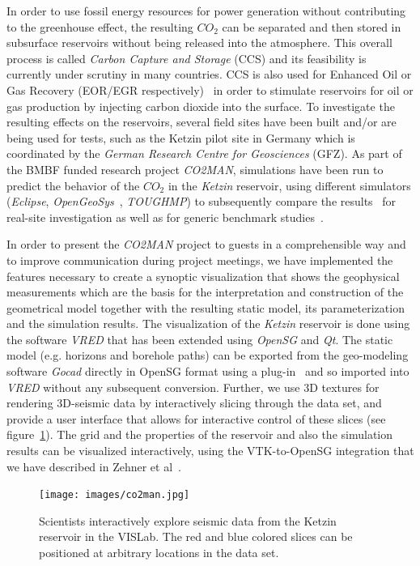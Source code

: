 \documentclass[twocolumn]{svjour3}          %
\begin{document}
In order to use fossil energy resources for power generation without contributing to the greenhouse effect, the resulting $CO_{2}$ can be separated and then stored in subsurface reservoirs without being released into the atmosphere. This overall process is called \emph{Carbon Capture and Storage} (CCS) and its feasibility is currently under scrutiny in many countries. CCS is also used for Enhanced Oil or Gas Recovery (EOR/EGR respectively)~\cite{Singh20113446} in order to stimulate reservoirs for oil or gas production by injecting carbon dioxide into the surface. To investigate the resulting effects on the reservoirs, several field sites have been built and/or are being used for tests, such as the Ketzin pilot site in Germany which is coordinated by the \emph{German Research Centre for Geosciences} (GFZ). As part of the BMBF funded research project \emph{CO2MAN}, simulations have been run to predict the behavior of the $CO_{2}$ in the \emph{Ketzin} reservoir, using different simulators (\emph{Eclipse}, \emph{OpenGeoSys}~\cite{Wang2014}, \emph{TOUGHMP}) to subsequently compare the results~\cite{Kempka2013418} for real-site investigation as well as for generic benchmark studies~\cite{Kolditz2012613}.

In order to present the \emph{CO2MAN} project to guests in a comprehensible way and to improve communication during project meetings, we have implemented the features necessary to create a synoptic visualization that shows the geophysical measurements which are the basis for the interpretation and construction of the geometrical model together with the resulting static model, its parameterization and the simulation results. The visualization of the \emph{Ketzin} reservoir is done using the software \emph{VRED} that has been extended using \emph{OpenSG} and \emph{Qt}. The static model (e.g. horizons and borehole paths) can be exported from the geo-modeling software \emph{Gocad} directly in OpenSG format using a plug-in~\cite{zehner:gocad} and so imported into \emph{VRED} without any subsequent conversion. Further, we use 3D textures for rendering 3D-seismic data by interactively slicing through the data set, and provide a user interface that allows for interactive control of these slices (see figure~\ref{fig:co2man}). The grid and the properties of the reservoir and also the simulation results can be visualized interactively, using the VTK-to-OpenSG integration that we have described in Zehner et al~\cite{zehner:uncertainty}.

\begin{figure}[htb]
  \texttt{[image: images/co2man.jpg]}
\caption{Scientists interactively explore seismic data from the Ketzin reservoir in the VISLab. The red and blue colored slices can be positioned at arbitrary locations in the data set.}
\label{fig:co2man}
\end{figure}
\end{document}
